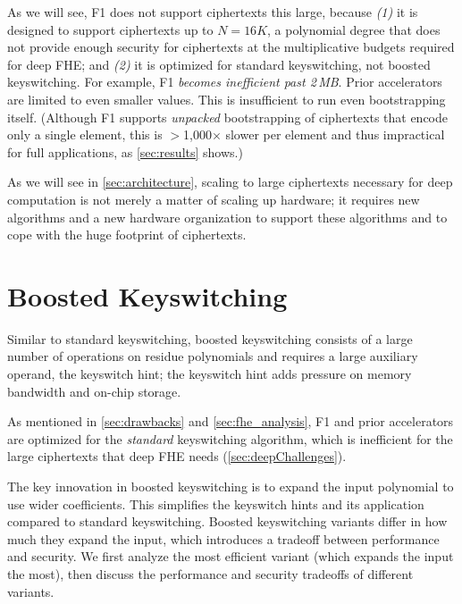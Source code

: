\figBootstrappingFrequency

As we will see, F1 does not support ciphertexts this large, because \emph{(1)}
it is designed to support ciphertexts up to $N=16K$, a polynomial degree that
does not provide enough security for ciphertexts at the multiplicative budgets
required for deep FHE; and \emph{(2)} it is optimized for standard
keyswitching, not boosted keyswitching. For example, F1 \emph{becomes
inefficient past 2\,MB}. Prior accelerators~\cite{riazi:asplos20:heax} are
limited to even smaller values. This is insufficient to run even bootstrapping
itself. (Although F1 supports \emph{unpacked} bootstrapping of ciphertexts that
encode only a single element, this is $>$1,000$\times$ slower per element and
thus impractical for full applications, as \autoref{sec:results} shows.)

As we will see in \autoref{sec:architecture}, scaling to large ciphertexts
necessary for deep computation is not merely a matter of scaling up hardware;
it requires new algorithms and a new hardware organization to support these
algorithms and to cope with the huge footprint of ciphertexts.

\section{Boosted Keyswitching}
\label{sec:boostedKeyswitching}

Similar to standard keyswitching, boosted keyswitching consists of a large
number of operations on residue polynomials and requires a large auxiliary
operand, the keyswitch hint; the keyswitch hint adds pressure on memory
bandwidth and on-chip storage.

\figKScompare

As mentioned in \autoref{sec:drawbacks} and \autoref{sec:fhe_analysis}, F1 and
prior accelerators are optimized for the \emph{standard} keyswitching
algorithm, which is inefficient for the large ciphertexts that deep FHE needs
(\autoref{sec:deepChallenges}).

The key innovation in boosted keyswitching is to expand the input polynomial to
use wider coefficients. This simplifies the keyswitch hints and its application
compared to standard keyswitching. Boosted keyswitching variants differ in how
much they expand the input, which introduces a tradeoff between performance and
security. We first analyze the most efficient variant (which expands the input
the most), then discuss the performance and security tradeoffs of different
variants.

